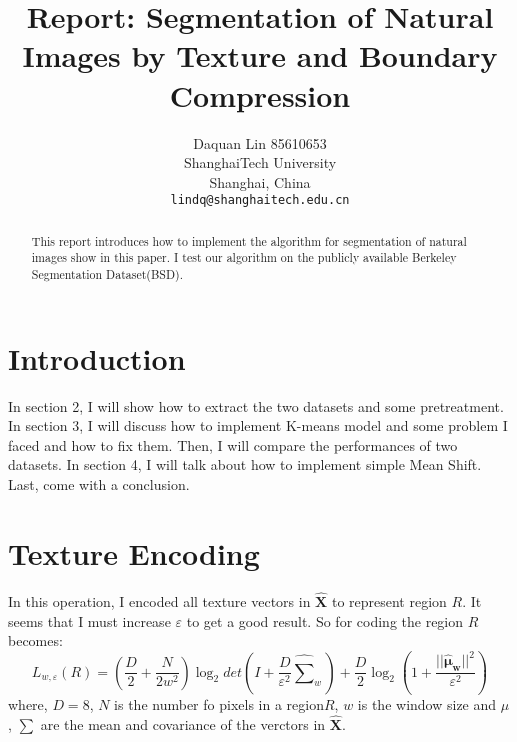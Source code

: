 \documentclass[10pt,twocolumn,letterpaper]{article}
\begin{document}
\title{Report: Segmentation of Natural Images by Texture and Boundary Compression}

\author{Daquan Lin 85610653\\
ShanghaiTech University\\
Shanghai, China\\
{\tt\small lindq@shanghaitech.edu.cn}
}

\maketitle

\begin{abstract}
   This report introduces how to implement the algorithm for segmentation of natural images show in this paper\cite{Mobahi2011Segmentation}. I test our algorithm on the publicly available Berkeley Segmentation Dataset(BSD)\cite{MartinFTM01}.

\end{abstract}

\section{Introduction}



\par In section 2, I will show how to extract the two datasets and some pretreatment. In section 3, I will discuss how to implement K-means model and some problem I faced and how to fix them. Then, I will compare the performances of two datasets. In section 4, I will talk about how to implement simple Mean Shift. Last, come with a conclusion.

\section{Texture Encoding}
In this operation, I encoded all texture vectors in $\bm{\hat X}$ to represent region $R$. It seems that I must increase $\varepsilon$ to get a good result.
So for coding the region $R$ becomes:
\begin{equation}
L_{w,\varepsilon}(R) = (\frac{D}{2} + \frac{N}{2w^2})\log_2 det(I+\frac{D}{\varepsilon^2}\hat \sum_w)+\frac{D}{2}\log_2(1+\frac{||\bm{\hat \mu_w}||^2}{\varepsilon^2})
\end{equation}
where, $D=8$, $N$ is the number fo pixels in a region$R$, $w$ is the window size and $\mu$ , $\sum$ are the mean and covariance of the verctors in $\bm{\hat X}$.
\end{document}
